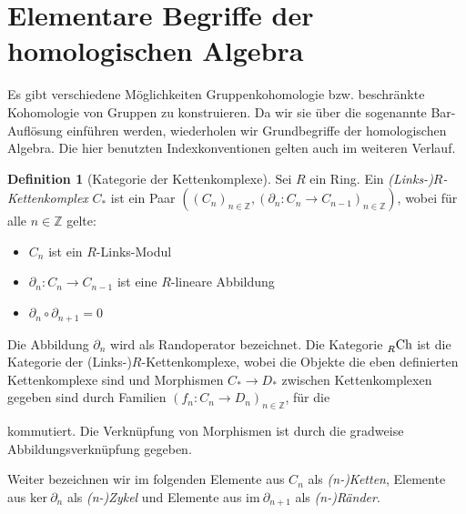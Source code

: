 \documentclass[a4paper,twoside,10pt]{scrreprt}
\newcommand{\Z}{\mathbb{Z}}
\theoremstyle{definition}
\newtheorem{definition}[satz]{Definition}
\begin{document}
\section{Elementare Begriffe der homologischen Algebra}
Es gibt verschiedene Möglichkeiten Gruppenkohomologie bzw. beschränkte Kohomologie von Gruppen zu konstruieren. Da wir sie über die sogenannte Bar-Auflösung einführen werden, wiederholen wir Grundbegriffe der homologischen Algebra. Die hier benutzten Indexkonventionen gelten auch im weiteren Verlauf.
\begin{definition}[Kategorie der Kettenkomplexe]\label{def:CatChainComplex}
Sei $R$ ein Ring. Ein \emph{(Links-)$R$-Kettenkomplex} $C_*$ ist ein Paar $\left(\left(C_n \right)_{n\in \Z},\left(\partial_n:C_n\to C_{n-1}\right)_{n\in \Z}\right)$, wobei für alle $n\in \Z$ gelte:
\begin{itemize}
\item $C_n$ ist ein $R$-Links-Modul
\item $\partial_n:C_n\to C_{n-1}$ ist eine $R$-lineare Abbildung
\item $\partial_n\circ \partial_{n+1}=0$
\end{itemize}
Die Abbildung $\partial_n$ wird als Randoperator bezeichnet.
Die Kategorie $\prescript{}{R}{\text{Ch}}$ ist die Kategorie der (Links-)$R$-Kettenkomplexe, wobei die Objekte die eben definierten Kettenkomplexe sind und Morphismen $C_*\to D_*$ zwischen Kettenkomplexen gegeben sind durch Familien $(f_n:C_n\to D_n)_{n\in \Z}$, für die
\begin{center}
\end{center}
kommutiert. Die Verknüpfung von Morphismen ist durch die gradweise Abbildungsverknüpfung gegeben.\par
Weiter bezeichnen wir im folgenden Elemente aus $C_n$ als \textit{(n-)Ketten}, Elemente aus $\text{ker}~\partial_n$ als \textit{(n-)Zykel} und Elemente aus $\text{im}~\partial_{n+1}$ als \textit{(n-)Ränder}.
\end{definition}
\end{document}
